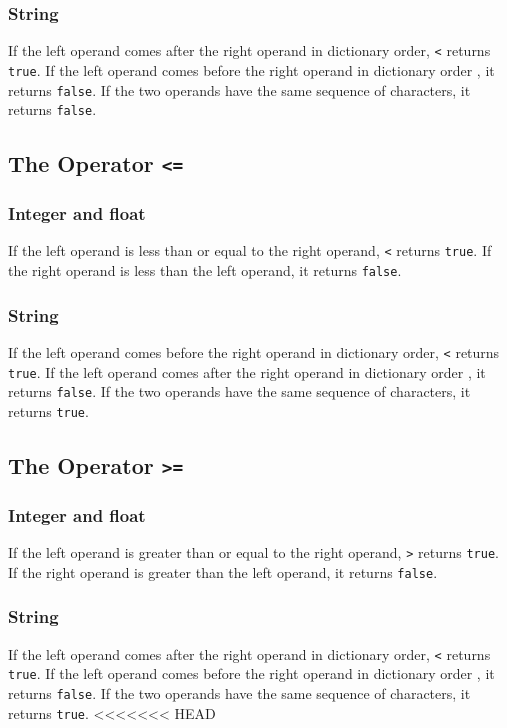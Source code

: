 \subsubsection{String}
If the left operand comes after the right operand in dictionary order, \verb!<! returns \verb!true!. If the left operand comes before the right operand in dictionary order , it returns \verb!false!. If the two operands have the same sequence of characters, it returns \verb!false!.

\subsection{The Operator {\tt <=}}
\subsubsection{Integer and float}
If the left operand is less than or equal to the right operand, \verb!<! returns \verb!true!. If the right operand is less than the left operand, it returns \verb!false!.
\subsubsection{String}
If the left operand comes before the right operand in dictionary order, \verb!<! returns \verb!true!. If the left operand comes after the right operand in dictionary order , it returns \verb!false!. If the two operands have the same sequence of characters, it returns \verb!true!.

\subsection{The Operator {\tt >=}}
\subsubsection{Integer and float}
If the left operand is greater than or equal to the right operand, \verb!>! returns \verb!true!. If the right operand is greater than the left operand, it returns \verb!false!.
\subsubsection{String}
If the left operand comes after the right operand in dictionary order, \verb!<! returns \verb!true!. If the left operand comes before the right operand in dictionary order , it returns \verb!false!. If the two operands have the same sequence of characters, it returns \verb!true!.
<<<<<<< HEAD

